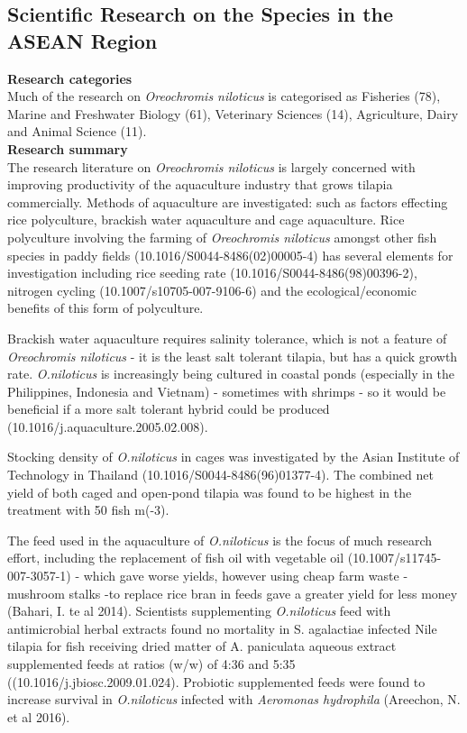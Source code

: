 \documentclass[]{book}
\theoremstyle{definition}
\theoremstyle{definition}
\theoremstyle{definition}
\theoremstyle{remark}
\begin{document}
\hypertarget{scientific-research-on-the-species-in-the-asean-region-2}{%
\subsection{Scientific Research on the Species in the ASEAN
Region}\label{scientific-research-on-the-species-in-the-asean-region-2}}

\textbf{Research categories}\\
Much of the research on \emph{Oreochromis niloticus} is categorised as
Fisheries (78), Marine and Freshwater Biology (61), Veterinary Sciences
(14), Agriculture, Dairy and Animal Science (11).\\
\textbf{Research summary}\\
The research literature on \emph{Oreochromis niloticus} is largely
concerned with improving productivity of the aquaculture industry that
grows tilapia commercially. Methods of aquaculture are investigated:
such as factors effecting rice polyculture, brackish water aquaculture
and cage aquaculture. Rice polyculture involving the farming of
\emph{Oreochromis niloticus} amongst other fish species in paddy fields
(10.1016/S0044-8486(02)00005-4) has several elements for investigation
including rice seeding rate (10.1016/S0044-8486(98)00396-2), nitrogen
cycling (10.1007/s10705-007-9106-6) and the ecological/economic benefits
of this form of polyculture.

Brackish water aquaculture requires salinity tolerance, which is not a
feature of \emph{Oreochromis niloticus} - it is the least salt tolerant
tilapia, but has a quick growth rate. \emph{O.niloticus} is increasingly
being cultured in coastal ponds (especially in the Philippines,
Indonesia and Vietnam) - sometimes with shrimps - so it would be
beneficial if a more salt tolerant hybrid could be produced
(10.1016/j.aquaculture.2005.02.008).

Stocking density of \emph{O.niloticus} in cages was investigated by the
Asian Institute of Technology in Thailand
(10.1016/S0044-8486(96)01377-4). The combined net yield of both caged
and open-pond tilapia was found to be highest in the treatment with 50
fish m(-3).

The feed used in the aquaculture of \emph{O.niloticus} is the focus of
much research effort, including the replacement of fish oil with
vegetable oil (10.1007/s11745-007-3057-1) - which gave worse yields,
however using cheap farm waste -mushroom stalks -to replace rice bran in
feeds gave a greater yield for less money (Bahari, I. te al 2014).
Scientists supplementing \emph{O.niloticus} feed with antimicrobial
herbal extracts found no mortality in S. agalactiae infected Nile
tilapia for fish receiving dried matter of A. paniculata aqueous extract
supplemented feeds at ratios (w/w) of 4:36 and 5:35
((10.1016/j.jbiosc.2009.01.024). Probiotic supplemented feeds were found
to increase survival in \emph{O.niloticus} infected with \emph{Aeromonas
hydrophila} (Areechon, N. et al 2016).
\end{document}
